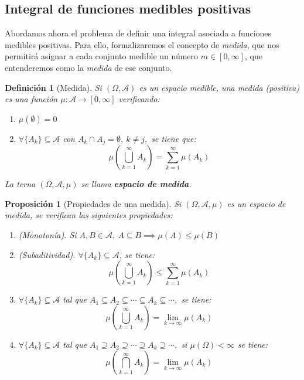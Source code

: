 \documentclass[11pt, a4paper]{article}
\theoremstyle{theorem-style}
\newtheorem{nprop}{Proposición}[section]
\theoremstyle{definition-style}
\newtheorem{ndef}{Definición}[section]
\theoremstyle{remark-style}
\theoremstyle{example-style}
\newenvironment{nlist}
{\begin{enumerate}
    \renewcommand\labelenumi{(\emph{\roman{enumi})}}}
  {\end{enumerate}}
\begin{document}

\subsection{Integral de funciones medibles positivas}

Abordamos ahora el problema de definir una integral asociada a funciones medibles positivas. Para ello, formalizaremos el concepto de \textit{medida}, que nos permitirá asignar a cada conjunto medible un número $m \in [0,\infty]$, que entenderemos como la \textit{medida} de ese conjunto. 

\begin{ndef}[Medida]
  Si $(\Omega, \mathcal A)$ es un espacio medible, una medida (positiva) es una función $\mu: \mathcal A \rightarrow [0, \infty]$ verificando:
  \begin{nlist}
  \item $\mu(\emptyset) = 0$
  \item $\forall \{A_k\} \subseteq \mathcal A$ con $A_k\cap A_j = \emptyset,\ k \neq j,$ se tiene que:
    $$\mu \left( \bigcup_{k=1}^\infty A_k \right) = \sum_{k=1}^\infty \mu(A_k) $$
  \end{nlist}
  La terna $(\Omega, \mathcal A, \mu)$ se llama \textbf{espacio de medida}.
\end{ndef}

\begin{nprop}[Propiedades de una medida] Si $(\Omega, \mathcal A, \mu)$ es un espacio de medida, se verifican las siguientes propiedades:
  \begin{nlist}
  \item (Monotonía). Si $A,B \in \mathcal{A},\ A \subseteq B \implies \mu(A) \leq \mu(B)$
  \item (Subaditividad). $\forall \{A_k\} \subseteq \mathcal{A}$, se tiene:
    \[
      \mu\left( \bigcup_{k=1}^\infty A_k \right) \leq \sum_{k=1}^\infty \mu(A_k)
    \]
  \item $\forall \{A_k\} \subseteq \mathcal{A}$ tal que $A_1\subseteq A_2\subseteq \cdots \subseteq A_k \subseteq \cdots,$ se tiene:
    $$\mu \left( \bigcup_{k=1}^\infty A_k \right) = \lim_{k \to \infty}\mu(A_k)$$
  \item $\forall \{A_k\} \subseteq \mathcal{A}$ tal que $A_1\supseteq A_2\supseteq \cdots \supseteq A_k \supseteq \cdots,$ si $\mu(\Omega) < \infty$ se tiene:
    $$\mu \left( \bigcap_{k=1}^\infty A_k \right) = \lim_{k \to \infty}\mu(A_k)$$
  \end{nlist}

\end{nprop}
\end{document}
